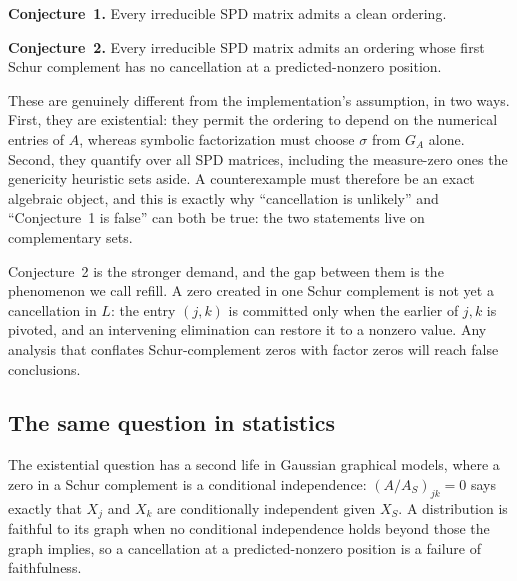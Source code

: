 \documentclass[11pt]{article}
\theoremstyle{plain}
\theoremstyle{definition}
\theoremstyle{remark}
\begin{document}
\begin{humanblock}
\noindent \textbf{Conjecture~1.} Every irreducible SPD matrix admits a clean ordering.
\newline

\noindent \textbf{Conjecture~2.} Every irreducible SPD matrix admits an ordering whose first Schur complement has no cancellation at a predicted-nonzero position.
\newline

These are genuinely different from the implementation's assumption, in two ways. First, they are existential: they permit the ordering to depend on the numerical entries of $A$, whereas symbolic factorization must choose $\sigma$ from $G_A$ alone. Second, they quantify over all SPD matrices, including the measure-zero ones the genericity heuristic sets aside. A counterexample must therefore be an exact algebraic object, and this is exactly why ``cancellation is unlikely'' and ``Conjecture~1 is false'' can both be true: the two statements live on complementary sets.

Conjecture~2 is the stronger demand, and the gap between them is the phenomenon we call refill. A zero created in one Schur complement is not yet a cancellation in $L$: the entry $(j,k)$ is committed only when the earlier of $j,k$ is pivoted, and an intervening elimination can restore it to a nonzero value. Any analysis that conflates Schur-complement zeros with factor zeros will reach false conclusions.%

\subsection{The same question in statistics}\label{sec:stats}

The existential question has a second life in Gaussian graphical models, where a zero in a Schur complement is a conditional independence: $(A/A_S)_{jk} = 0$ says exactly that $X_j$ and $X_k$ are conditionally independent given $X_S$. A distribution is faithful to its graph when no conditional independence holds beyond those the graph implies, so a cancellation at a predicted-nonzero position is a failure of faithfulness.


\end{humanblock}
\end{document}
